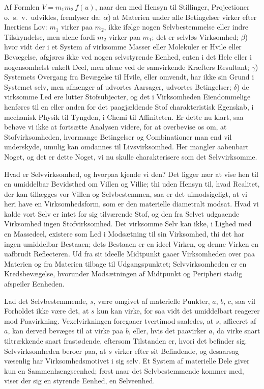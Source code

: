 \documentclass[12pt]{book}
\newcommand{\apage}[1]{\marginnote{\footnotesize\textit{[#1]}}}
\begin{document}
Af Formlen $V = m_1 m_2\, f(u)$, naar den med Hensyn til Stillinger,
Projectioner o.\ s.\ v.\ udvikles, fremlyser da: $\alpha$) at Materien under
alle Betingelser virker efter Inertiens Lov: $m_1$ virker paa $m_2$, ikke
ifølge nogen Selvbestemmelse eller indre Tilskyndelse, men alene fordi
$m_2$ virker paa $m_1$; det er selvløs Virksomhed; $\beta$) hvor vidt der i
et System af virksomme Masser eller Molekuler er Hvile eller Bevægelse,
afgjøres ikke ved nogen selvstyrende Eenhed, enten i det Hele eller i
nogensomhelst enkelt Deel, men alene ved de samvirkende Kræfters Resultant;
$\gamma$) Systemets Overgang \apage{179} fra Bevægelse til Hvile, eller omvendt, har
ikke sin Grund i Systemet selv, men afhænger af udvortes Aarsager, udvortes
Betingelser; $\delta$) de virksomme Led ere lutter Stofsubjecter, og det i
Virksomheden Eiendommelige henføres til en eller anden for det paagjældende
Stof charakteristisk Egenskab, i mechanisk Physik til Tyngden, i Chemi til
Affiniteten. Er dette nu klart, saa behøve vi ikke at fortsætte Analysen
videre, for at overbevise os om, at Stofvirksomheden, hvormange Betingelser
og Combinationer man end vil underskyde, umulig kan omdannes til
Livsvirksomhed. Her mangler aabenbart Noget, og det er dette Noget, vi nu
skulle charakterisere som det Selvvirksomme.

Hvad er Selvvirksomhed, og hvorpaa kjende vi den? Det ligger nær at vise
hen til en umiddelbar Bevidsthed om Villen og Villie; thi uden Hensyn til,
hvad Realitet, der kan tillægges vor Villen og Selvbestemmen, saa er det
uimodsigeligt, at vi heri have en Virksomhedsform, som er den materielle
diametralt modsat. Hvad vi kalde vort Selv er intet for sig tilværende
Stof, og den fra Selvet udgaaende Virksomhed ingen Stofvirksomhed. Det
virksomme Selv kan ikke, i Lighed med en Massedeel, existere som Led i
Modsætning til sin Virksomhed, thi det har ingen umiddelbar Bestaaen; dets
Bestaaen er en ideel Virken, og denne Virken en uafbrudt Reflecteren. Ud
fra sit ideelle Midtpunkt gaaer Virksomheden over paa Materien og fra
Materien tilbage til Udgangspunktet; Selvvirksomheden er en Kredsbevægelse,
hvorunder \apage{180} Modsætningen af Midtpunkt og Peripheri stadig afspeiler Eenheden.

Lad det Selvbestemmende, $s$, være omgivet af materielle Punkter, $a$, $b$,
$c$, saa vil Forholdet ikke være det, at $s$ kun kan virke, for saa vidt
det umiddelbart reagerer mod Paavirkning. Vexelvirkningen foregaaer
tvertimod saaledes, at $s$, afficeret af $a$, kan derved bevæges til at
virke paa $b$, eller, hvis det paavirker $a$, da virke snart tiltrækkende
snart frastødende, eftersom Tilstanden er, hvori det befinder sig.
Selvvirksomheden beroer paa, at $s$ virker efter sit Befindende, og
desaarsag væsenlig har Virksomhedsmotivet i sig selv. Et System af
materielle Dele giver kun en Sammenhængseenhed; først naar det
Selvbestemmende kommer med, viser der sig en styrende Eenhed, en
Selveenhed.
\end{document}
